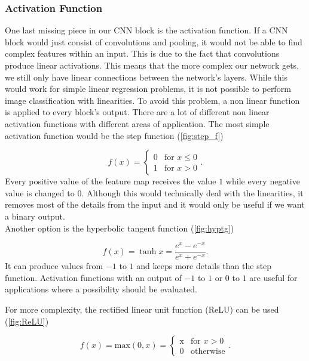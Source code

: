 \subsubsection*{Activation Function}
One last missing piece in our CNN block is the activation function. If a CNN block would just consist of convolutions and pooling, it would not be able to find complex features within an input. This is due to the fact that convolutions produce linear activations. This means that the more complex our network gets, we still only have linear connections between the network's layers. While this would work for simple linear regression problems, it is not possible to perform image classification with linearities. To avoid this problem, a non linear function is applied to every block's output. There are a lot of different non linear activation functions with different areas of application. The most simple activation function would be the step function (\autoref{fig:step_f})

\begin{equation}
    f(x) = \begin{cases} \mbox{0} & \mbox{for } x \leq 0 \\ \mbox{1} & \mbox{for } x > 0 \end{cases}.
\end{equation}
Every positive value of the feature map receives the value $1$ while every negative value is changed to $0$. Although this would technically deal with the linearities, it removes most of the details from the input and it would only be useful if we want a binary output. \\

Another option is the hyperbolic tangent function (\autoref{fig:hyptg})

\begin{equation}
    f(x) = \tanh{x} = \frac{e^x - e^{-x}}{e^x + e^{-x}}.
\end{equation}
It can produce values from $-1$ to $1$ and keeps more details than the step function. Activation functions with an output of $-1$ to $1$ or $0$ to $1$ are useful for applications where a possibility should be evaluated.

For more complexity, the rectified linear unit function (ReLU) can be used (\autoref{fig:ReLU})

\begin{equation}
    f(x) = \text{max}(0,x) = \begin{cases}
        \mbox{x} & \mbox{for } x > 0 \\ \mbox{0} & \text{otherwise}
    \end{cases}.
\end{equation}

